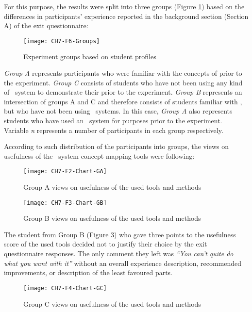 For this purpose, the results were split into three groups (Figure
\ref{fig:groups}) based on the differences in participants' experience
reported in the background section (Section A) of the exit questionnaire:

\begin{figure}[htb]
\centering
\texttt{[image: CH7-F6-Groups]}
\caption{Experiment groups based on student profiles}
\label{fig:groups}
\end{figure}

\FloatBarrier

\textit{Group A} represents participants who were familiar with the concepts of
\LLLs prior to the experiment. \textit{Group C} consists of students who have
not been using any kind of \ep~system to demonstrate their \LLLs prior to the
experiment. \textit{Group B} represents an intersection of groups A and C and
therefore consists of students familiar with \LLLsn, but who have not been using
\ep~systems. In this case, \textit{Group A} also represents students who
have used an \ep~system for \LLLs purposes prior to the experiment. Variable
\textit{n} represents a number of participants in each group respectively.

According to such distribution of the participants into groups, the views on
usefulness of the \ep~system concept mapping tools were following:

\begin{figure}[htb]
\centering
\texttt{[image: CH7-F2-Chart-GA]}
\caption{Group A views on usefulness of the used tools and methods}
\label{fig:group1}
\end{figure}

\begin{figure}[htb]
\centering
\texttt{[image: CH7-F3-Chart-GB]}
\caption{Group B views on usefulness of the used tools and methods}
\label{fig:group2}
\end{figure}

The student from Group B (Figure \ref{fig:group2}) who gave three points to the
usefulness score of the used tools decided not to justify their choice by the
exit questionnaire responses. The only comment they left was \textit{``You can't
quite do what you want with it''} without an overall experience description,
recommended improvements, or description of the least favoured parts.

\begin{figure}[htb]
\centering
\texttt{[image: CH7-F4-Chart-GC]}
\caption{Group C views on usefulness of the used tools and methods}
\label{fig:group3}
\end{figure}

